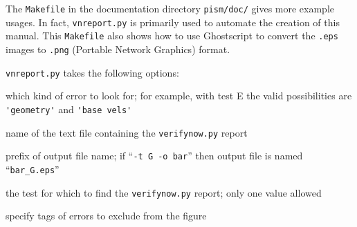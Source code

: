 \documentclass[11pt,final]{amsart}
\begin{document}
The \verb|Makefile| in the documentation directory \verb|pism/doc/| gives more example usages.  In fact, \verb|vnreport.py| is primarily used to automate the creation of this manual.  This \verb|Makefile| also shows how to use Ghostscript to convert the \verb|.eps| images to \verb|.png| (Portable Network Graphics) format.

\verb|vnreport.py| takes the following options:

 which kind of error to look for; for example, with test E the valid possibilities are \verb|'geometry'| and \verb|'base vels'|

 name of the text file containing the \verb|verifynow.py| report

 prefix of output file name; if ``\verb|-t G -o bar|'' then output file is named ``\verb|bar_G.eps|''

 the test for which to find the \verb|verifynow.py| report; only one value allowed

 specify tags of errors to exclude from the figure


\printindex
\end{document}
